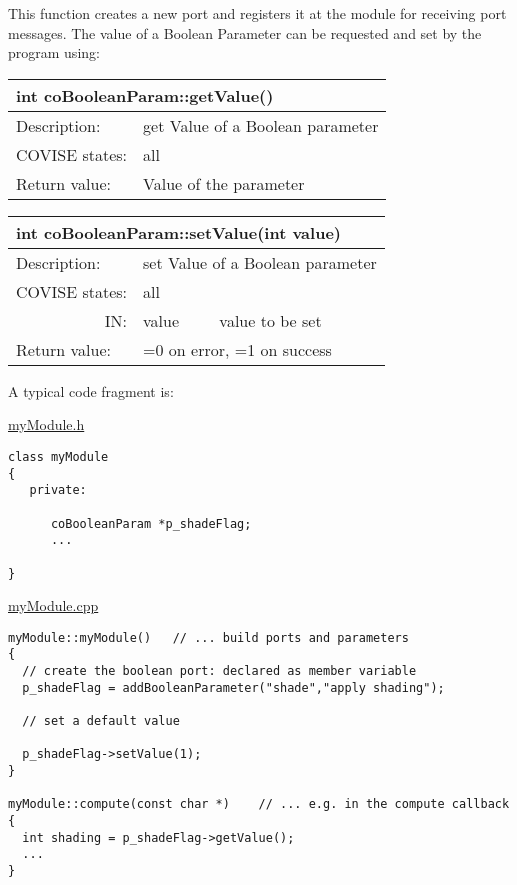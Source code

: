 This function creates a new port and registers it at the module for receiving port 
messages. The value of a Boolean Parameter can be requested and set by the program using:


\begin{longtable}{|p{4cm}|p{10cm}|}
\hline
\multicolumn{2}{|p{13.5cm}|}{\bf int coBooleanParam::getValue()} \\
\hline
{Description:}   
                        & {get Value of a Boolean parameter } \\
\hline
{COVISE states:} & {all} \\
\hline
{Return value:}  
                        & {Value of the parameter } \endhead
\hline
\end{longtable}


\begin{longtable}{|p{4cm}|p{2.5cm}|p{7cm}|}
\hline
\multicolumn{3}{|p{13.5cm}|}{\bf int coBooleanParam::setValue(int value)} \\
\hline
{Description:}   
                        & \multicolumn{2}{|p{9.5cm}|}{set Value of a Boolean parameter} \\
\hline
{COVISE states:} & \multicolumn{2}{|p{9.5cm}|}{all} \\
\hline
\multicolumn{1}{|r|}{IN:} & {value} 
                             & {value to be set}\\
\hline
{Return value:}  
                        & \multicolumn{2}{|p{9.5cm}|}{=0 on error, =1 on success} \endhead
\hline
\end{longtable}

A typical code fragment is:

\underline{myModule.h}

\begin{verbatim}
class myModule
{
   private:

      coBooleanParam *p_shadeFlag;
      ...
   
}
\end{verbatim} 

\underline{myModule.cpp}

\begin{verbatim}
myModule::myModule()   // ... build ports and parameters
{
  // create the boolean port: declared as member variable
  p_shadeFlag = addBooleanParameter("shade","apply shading");
 
  // set a default value

  p_shadeFlag->setValue(1);
}

myModule::compute(const char *)    // ... e.g. in the compute callback
{
  int shading = p_shadeFlag->getValue();
  ...
}
\end{verbatim} 

